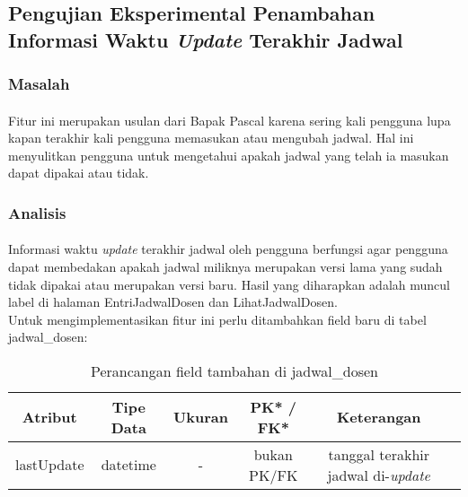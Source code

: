 \subsection{Pengujian Eksperimental Penambahan Informasi Waktu \textit{Update} Terakhir Jadwal}
\subsubsection{Masalah}
\paragraph{}Fitur ini merupakan usulan dari Bapak Pascal karena sering kali pengguna lupa kapan terakhir kali pengguna memasukan atau mengubah jadwal. Hal ini menyulitkan pengguna untuk mengetahui apakah jadwal yang telah ia masukan dapat dipakai atau tidak.
\subsubsection{Analisis}
\paragraph{}Informasi waktu \textit{update} terakhir jadwal oleh pengguna berfungsi agar pengguna dapat membedakan apakah jadwal miliknya merupakan versi lama yang sudah tidak dipakai atau merupakan versi baru. Hasil yang diharapkan adalah muncul label di halaman EntriJadwalDosen dan LihatJadwalDosen.\\
Untuk mengimplementasikan fitur ini perlu ditambahkan field baru di tabel jadwal\_dosen:
\begin{center}
\begin{table}[h]
\caption{Perancangan field tambahan di jadwal\_dosen}
\begin{tabular}{|c|c|c|c|c|c|}
 			\hline
		\textbf{Atribut} & \textbf{Tipe Data} & \textbf{Ukuran} & \textbf{PK* / FK*}  & \textbf{Keterangan} \\
			\hline
		 lastUpdate & datetime & - & bukan PK/FK &  tanggal terakhir jadwal di-\textit{update}\\
		 \hline
	\end{tabular}
	\end{table}
\end{center}
